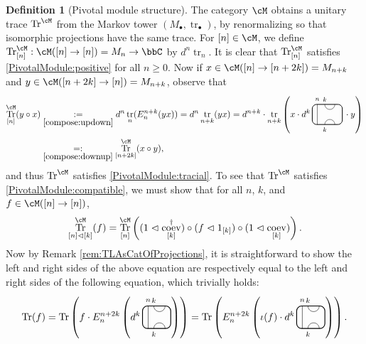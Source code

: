 \documentclass[11pt]{article}
\theoremstyle{plain}
\theoremstyle{definition}
\newtheorem{defn}[thm]{Definition}
\DeclareMathOperator{\coev}{coev}
\DeclareMathOperator{\Tr}{Tr}
\DeclareMathOperator{\tr}{tr}
\begin{document}
\begin{defn}[Pivotal module structure] 
\label{def:PivotalModuleFromMarkovTower}
The category $\cM$ obtains a unitary trace $\Tr^\cM$ from the Markov tower $(M_\bullet,\tr_\bullet)$, by renormalizing so that isomorphic projections have the same trace.
For $[n] \in \cM$, we define $\Tr^\cM_{[n]} : \cM([n] \to [n]) = M_n \to \bbC$ by $d^n \tr_n$.
It is clear that $\Tr^\cM_{[n]}$ satisfies \ref{PivotalModule:positive} for all $n\geq 0$.
Now if $x \in \cM([n] \to [n+ 2k])= M_{n+k}$ and $y\in \cM ([n+ 2k] \to [n]) = M_{n+ k}$, observe that 
\begin{align*}
\Tr^\cM_{[n]}(y\circ x)
&\underset{\ref{compose:updown}}{:=}
d^n\tr_n(E^{n+k}_n(yx))
=
d^n \tr_{n+k}(yx)
=
d^{n+k}
\cdot
\tr_{n+k}
\left(
x \cdot
d^{k}\,
\begin{tikzpicture}[baseline = .3cm]
 \draw[thick, rounded corners = 5pt] (0,0) rectangle (1.2,.8);
 \draw (.2,0) -- (.2,.8);
 \draw (.5,.8) arc (-180:0:.2cm);
 \draw (.5,0) arc (180:0:.2cm);
 \node at (.2,1) {\scriptsize{$n$}};
 \node at (.5,1) {\scriptsize{$k$}};
 \node at (.5,-.2) {\scriptsize{$k$}};
\end{tikzpicture}\,
\cdot y
\right)
\\&\underset{\ref{compose:downup}}{=:}
\Tr^\cM_{[n+2k]}(x\circ y),
\end{align*}
and thus $\Tr^\cM$ satisfies \ref{PivotalModule:tracial}.
To see that $\Tr^\cM$ satisfies \ref{PivotalModule:compatible}, we must show that for all $n$, $k$, and $f\in\cM([n]\to[n])$,
 \[\Tr^\cM_{[n]\vartriangleleft[k]}(f)=\Tr^\cM_{[n]}\left((1\vartriangleleft\coev_{[k]}^\dag)\circ(f\vartriangleleft1_{[k]})\circ(1\vartriangleleft\coev_{[k]})\right).
 \]
 Now by Remark \ref{rem:TLAsCatOfProjections}, it is straightforward to show the left and right sides of the above equation are respectively equal to the left and right sides of the following equation, which trivially holds:
  \[
  \Tr(f)
  =
  \Tr\left(f\cdot E^{n+2k}_n\left(d^{k}\,
  \begin{tikzpicture}[baseline=.3cm]
   \draw (.2,0) -- (.2,.8);
   \node at (.2,1) {\scriptsize{$n$}};
   \draw (.4,.8) arc (-180:0:.2cm);
   \node at (.4,1) {\scriptsize{$k$}};
   \draw (.4,0) arc (180:0:.2cm);
   \node at (.4,-.2) {\scriptsize{$k$}};
   \draw[thick, rounded corners = 5pt] (0,0) rectangle (1,.8);
  \end{tikzpicture}
 \right)\right)
 =
 \Tr\left(E^{n+2k}_n\left(\iota(f)\cdot d^{k}\,
  \begin{tikzpicture}[baseline=.3cm]
   \draw (.2,0) -- (.2,.8);
   \node at (.2,1) {\scriptsize{$n$}};
   \draw (.4,.8) arc (-180:0:.2cm);
   \node at (.4,1) {\scriptsize{$k$}};
   \draw (.4,0) arc (180:0:.2cm);
   \node at (.4,-.2) {\scriptsize{$k$}};
   \draw[thick, rounded corners = 5pt] (0,0) rectangle (1,.8);
  \end{tikzpicture}
 \right)\right)
 \text{.}
 \]
\end{defn}
\end{document}
